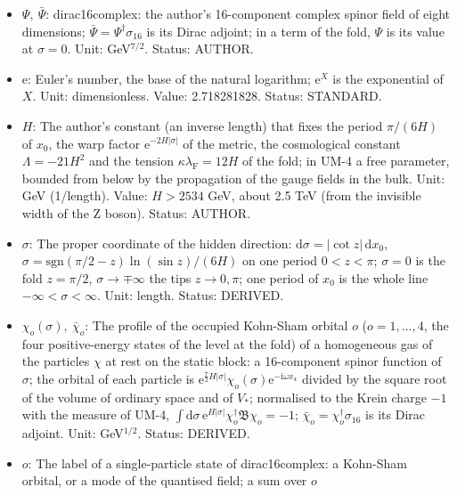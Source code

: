 \documentclass[
  10pt,
]{article}
\providecommand{\tightlist}{%
  \setlength{\itemsep}{0pt}\setlength{\parskip}{0pt}}
\begin{document}
\begin{itemize}
\tightlist
\item
  \(\Psi,\ \bar\Psi\): dirac16complex: the author's 16-component complex
  spinor field of eight dimensions;
  \(\bar\Psi = \Psi^\dagger\sigma_{16}\) is its Dirac adjoint; in a term
  of the fold, \(\Psi\) is its value at \(\sigma = 0\). Unit:
  GeV\(^{7/2}\). Status: AUTHOR.
\item
  \(\mathrm{e}\): Euler's number, the base of the natural logarithm;
  \(\mathrm{e}^{X}\) is the exponential of \(X\). Unit: dimensionless.
  Value: 2.718281828. Status: STANDARD.
\item
  \(H\): The author's constant (an inverse length) that fixes the period
  \(\pi/(6H)\) of \(x_0\), the warp factor
  \(\mathrm{e}^{-2H\lvert\sigma\rvert}\) of the metric, the cosmological
  constant \(\Lambda = -21H^2\) and the tension
  \(\kappa\lambda_{\mathrm{F}} = 12H\) of the fold; in UM-4 a free
  parameter, bounded from below by the propagation of the gauge fields
  in the bulk. Unit: GeV (1/length). Value: \(H > 2534\) GeV, about 2.5
  TeV (from the invisible width of the Z boson). Status: AUTHOR.
\item
  \(\sigma\): The proper coordinate of the hidden direction:
  \(\mathrm{d}\sigma = \lvert\cot z\rvert\,\mathrm{d}x_0\),
  \(\sigma = \mathrm{sgn}(\pi/2 - z)\ln(\sin z)/(6H)\) on one period
  \(0 < z < \pi\); \(\sigma = 0\) is the fold \(z = \pi/2\),
  \(\sigma \to \mp\infty\) the tips \(z \to 0, \pi\); one period of
  \(x_0\) is the whole line \(-\infty < \sigma < \infty\). Unit: length.
  Status: DERIVED.
\item
  \(\chi_o(\sigma),\ \bar\chi_o\): The profile of the occupied Kohn-Sham
  orbital \(o\) (\(o = 1, \dots, 4\), the four positive-energy states of
  the level at the fold) of a homogeneous gas of the particles \(\chi\)
  at rest on the static block: a 16-component spinor function of
  \(\sigma\); the orbital of each particle is
  \(\mathrm{e}^{\frac72H\lvert\sigma\rvert}\chi_o(\sigma)\mathrm{e}^{-\mathrm{i}\omega x_4}\)
  divided by the square root of the volume of ordinary space and of
  \(V_*\); normalised to the Krein charge \(-1\) with the measure of
  UM-4,
  \(\int\mathrm{d}\sigma\,\mathrm{e}^{H\lvert\sigma\rvert}\chi_o^\dagger\mathfrak{B}\chi_o = -1\);
  \(\bar\chi_o = \chi_o^\dagger\sigma_{16}\) is its Dirac adjoint. Unit:
  GeV\(^{1/2}\). Status: DERIVED.
\item
  \(o\): The label of a single-particle state of dirac16complex: a
  Kohn-Sham orbital, or a mode of the quantised field; a sum over \(o\)

\end{itemize}
\end{document}
